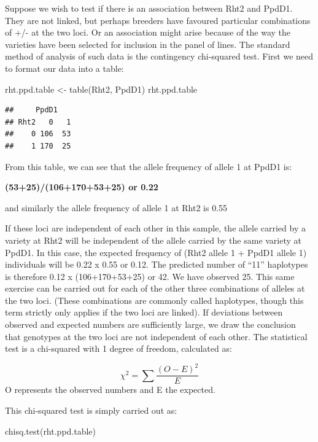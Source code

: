 \documentclass[
]{book}
\newenvironment{Shaded}{\begin{snugshade}}{\end{snugshade}}
\newcommand{\FunctionTok}[1]{\textcolor[rgb]{0.00,0.00,0.00}{#1}}
\newcommand{\NormalTok}[1]{#1}
\newcommand{\OtherTok}[1]{\textcolor[rgb]{0.56,0.35,0.01}{#1}}
\begin{document}
Suppose we wish to test if there is an association between Rht2 and PpdD1. They are not linked, but perhaps breeders have favoured particular combinations of +/- at the two loci. Or an association might arise because of the way the varieties have been selected for inclusion in the panel of lines. The standard method of analysis of such data is the contingency chi-squared test.
First we need to format our data into a table:

\begin{Shaded}
\begin{Highlighting}[]
\NormalTok{rht.ppd.table }\OtherTok{\textless{}{-}} \FunctionTok{table}\NormalTok{(Rht2, PpdD1)}
\NormalTok{rht.ppd.table}
\end{Highlighting}
\end{Shaded}

\begin{verbatim}
##     PpdD1
## Rht2   0   1
##    0 106  53
##    1 170  25
\end{verbatim}

From this table, we can see that the allele frequency of allele 1 at PpdD1 is:

\textbf{(53+25)/(106+170+53+25) or 0.22}

and similarly the allele frequency of allele 1 at Rht2 is 0.55

If these loci are independent of each other in this sample, the allele carried by a variety at Rht2 will be independent of the allele carried by the same variety at PpdD1. In this case, the expected frequency of (Rht2 allele 1 + PpdD1 allele 1) individuals will be 0.22 x 0.55 or 0.12. The predicted number of ``11'' haplotypes is therefore 0.12 x (106+170+53+25) or 42. We have observed 25. This same exercise can be carried out for each of the other three combinations of alleles at the two loci. (These combinations are commonly called haplotypes, though this term strictly only applies if the two loci are linked). If deviations between observed and expected numbers are sufficiently large, we draw the conclusion that genotypes at the two loci are not independent of each other. The statistical test is a chi-squared with 1 degree of freedom, calculated as:

\[\chi^2 = \sum \frac {(O - E)^2}{E}\]
O represents the observed numbers and E the expected.

This chi-squared test is simply carried out as:

\begin{Shaded}
\begin{Highlighting}[]
\FunctionTok{chisq.test}\NormalTok{(rht.ppd.table)}
\end{Highlighting}
\end{Shaded}
\end{document}
